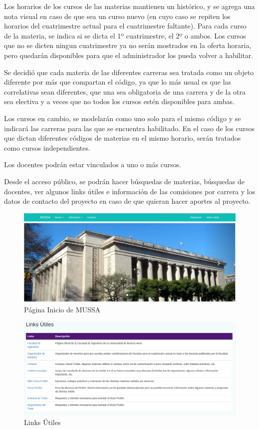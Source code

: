 \documentclass[a4paper]{article}
\begin{document}
Los horarios de los cursos de las materias mantienen un histórico, y se agrega una nota visual en caso de que sea un curso nuevo (en cuyo caso se repiten los horarios del cuatrimestre actual para el cuatrimestre faltante). Para cada curso de la materia, se indica si se dicta el 1º cuatrimestre, el 2º o ambos. Los cursos que no se dicten ningun cuatrimestre ya no serán mostrados en la oferta horaria, pero quedarán disponibles para que el administrador los pueda volver a habilitar.

Se decidió que cada materia de las diferentes carreras sea tratada como un objeto diferente por más que compartan el código, ya que lo más usual es que las correlativas sean diferentes, que una sea obligatoria de una carrera y de la otra sea electiva y a veces que no todos los cursos estén disponibles para ambas.

Los cursos en cambio, se modelarán como uno solo para el mismo código y se indicará las carreras para las que se encuentra habilitado. En el caso de los cursos que dictan diferentes códigos de materias en el mismo horario, serán tratados como cursos independientes.

Los docentes podrán estar vinculados a uno o más cursos.\newline

Desde el acceso público, se podrán hacer búsquedas de materias, búsquedas de docentes, ver algunos links útiles e información de las comisiones por carrera y los datos de contacto del proyecto en caso de que quieran hacer aportes al proyecto.\newline

\begin{figure}[H]
\centering
\includegraphics[scale=0.25]{Imagenes/pagina_inicio.png}\par
\caption{Página Inicio de MUSSA}
\end{figure}

\begin{figure}[H]
\centering
\includegraphics[scale=0.3]{Imagenes/links_utiles.png}\par
\caption{Links Útiles}
\end{figure}
\end{document}
